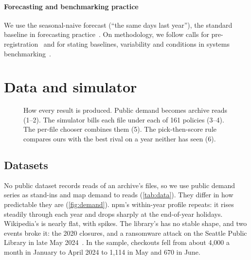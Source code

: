 \documentclass[11pt]{article}
\begin{document}
\paragraph{Forecasting and benchmarking practice} We use the seasonal-naive forecast (``the same days last year''), the standard baseline in forecasting practice~\cite{hyndman2021fpp3}. On methodology, we follow calls for pre-registration~\cite{nosek2018preregistration} and for stating baselines, variability and conditions in systems benchmarking~\cite{hoefler2015benchmarking}.

\section{Data and simulator}
\label{sec:sim}

\begin{figure}[t]
\centering

\caption{How every result is produced. Public demand becomes archive reads (1--2). The simulator bills each file under each of 161 policies (3--4). The per-file chooser combines them (5). The pick-then-score rule compares ours with the best rival on a year neither has seen (6).}
\label{fig:pipeline}
\end{figure}

\subsection{Datasets}

No public dataset records reads of an archive's files, so we use public demand series as stand-ins and map demand to reads (\cref{tab:data}). They differ in how predictable they are (\cref{fig:demand}). npm's within-year profile repeats: it rises steadily through each year and drops sharply at the end-of-year holidays. Wikipedia's is nearly flat, with spikes. The library's has no stable shape, and two events broke it: the 2020 closures, and a ransomware attack on the Seattle Public Library in late May 2024~\cite{spl_cyberattack}. In the sample, checkouts fell from about 4,000 a month in January to April 2024 to 1,114 in May and 670 in June.
\end{document}
